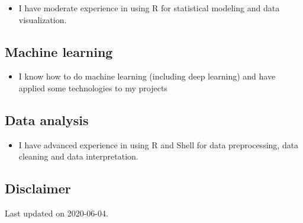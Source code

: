 \documentclass[
]{article}
\providecommand{\tightlist}{%
  \setlength{\itemsep}{0pt}\setlength{\parskip}{0pt}}
\begin{document}
\begin{itemize}
\tightlist
\item
  I have moderate experience in using R for statistical modeling and
  data visualization.
\end{itemize}

\hypertarget{machine-learning}{%
\subsection{Machine learning}\label{machine-learning}}

\begin{itemize}
\tightlist
\item
  I know how to do machine learning (including deep learning) and have
  applied some technologies to my projects
\end{itemize}

\hypertarget{data-analysis}{%
\subsection{Data analysis}\label{data-analysis}}

\begin{itemize}
\tightlist
\item
  I have advanced experience in using R and Shell for data
  preprocessing, data cleaning and data interpretation.
\end{itemize}

\hypertarget{disclaimer}{%
\subsection{Disclaimer}\label{disclaimer}}

Last updated on 2020-06-04.
\end{document}
